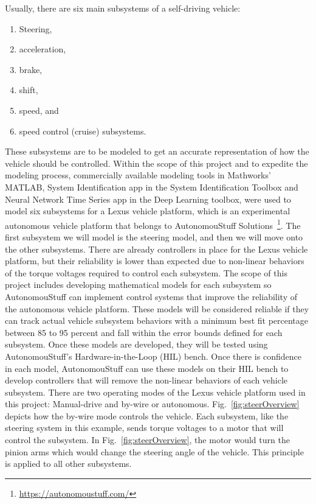 \documentclass[journal,twoside,web]{ieeecolor}
\begin{document}
\noindent Usually, there are six main subsystems of a self-driving vehicle: %
%
\begin{enumerate}
\item  Steering,
  
\item acceleration,
  
\item brake,
  
\item shift,

\item speed, and 
  
\item speed control (cruise) subsystems.
\end{enumerate}
%
These subsystems are to be modeled to get an accurate representation of how
the vehicle should be controlled. Within the scope of this project and to expedite the modeling process, commercially available modeling tools in Mathworks' MATLAB, System Identification app in the System Identification Toolbox and Neural Network Time Series app in the Deep Learning toolbox, were used to model six subsystems for a Lexus vehicle platform, which is an experimental autonomous vehicle platform that belongs to AutonomouStuff Solutions~\footnote{\url{https://autonomoustuff.com/}}. The first subsystem we will model is the steering model, and then we will move onto
the other subsystems. There are already controllers in place for the Lexus
vehicle platform, but their reliability is lower than expected due to non-linear
behaviors of the torque voltages required to control each subsystem. The scope
of this project includes developing mathematical models for each subsystem so
AutonomouStuff can implement control systems that improve the reliability of the
autonomous vehicle platform. These models will be considered reliable if they can track actual vehicle subsystem behaviors with a minimum best fit percentage between 85 to 95 percent and fall within the error bounds defined for each subsystem. Once these models are developed, they will be tested using AutonomouStuff's Hardware-in-the-Loop (HIL) bench.
Once there is confidence in each model, AutonomouStuff can use these models on their HIL bench to develop controllers that will remove the non-linear behaviors of each vehicle subsystem.
There are two operating modes of the Lexus vehicle platform used in this project: Manual-drive and by-wire or autonomous.
Fig.~\ref{fig:steerOverview} depicts how the by-wire mode controls the vehicle. Each
subsystem, like the steering system in this example, sends torque voltages to a
motor that will control the subsystem. In Fig.~\ref{fig:steerOverview}, the motor would
turn the pinion arms which would change the steering angle of the vehicle. This
principle is applied to all other subsystems.
\end{document}

